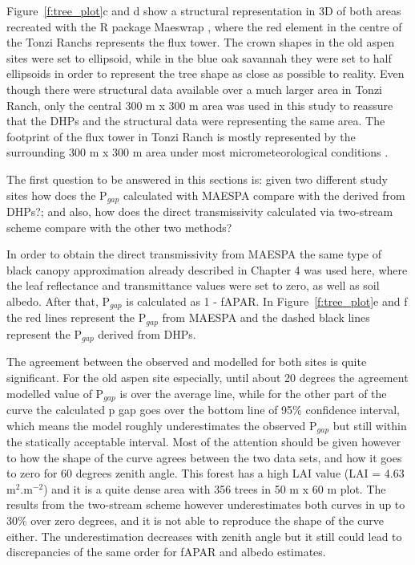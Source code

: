 \documentclass[a4paper,11pt]{report}
\begin{document}
Figure~\ref{f:tree_plot}c and d show a structural representation in 3D of both areas recreated with the R package Maeswrap \citep{Duursma2015}, where the red element in the centre of the Tonzi Ranch\textquotesingle s represents the flux tower. The crown shapes in the old aspen sites were set to ellipsoid, while in the blue oak savannah they were set to half ellipsoids in order to represent the tree shape as close as possible to reality. Even though there were structural data available over a much larger area in Tonzi Ranch, only the central 300 m x 300 m area was used in this study to reassure that the DHPs and the structural data were representing the same area. The footprint of the flux tower in Tonzi Ranch is mostly represented by the surrounding 300 m x 300 m area under most micrometeorological conditions \citep{Baldocchi2006}.

The first question to be answered in this sections is: given two different study sites how does the P$_{gap}$ calculated with MAESPA compare with the derived from DHPs?; and also, how does the direct transmissivity calculated via two-stream scheme compare with the other two methods?

In order to obtain the direct transmissivity from MAESPA the same type of black canopy approximation already described in Chapter 4 was used here, where the leaf reflectance and transmittance values were set to zero, as well as soil albedo. After that, P$_{gap}$ is calculated as 1 - fAPAR. In Figure~\ref{f:tree_plot}e and f the red lines represent the P$_{gap}$ from MAESPA and the dashed black lines represent the P$_{gap}$ derived from DHPs.

The agreement between the observed and modelled for both sites is quite significant. For the old aspen site especially, until about 20 degrees the agreement modelled value of P$_{gap}$ is over the average line, while for the other part of the curve the calculated p gap goes over the bottom line of 95\% confidence interval, which means the model roughly underestimates the observed P$_{gap}$ but still within the statically acceptable interval. Most of the attention should be given however to how the shape of the curve agrees between the two data sets, and how it goes to zero for 60 degrees zenith angle. This forest has a high LAI value (LAI = 4.63 m$^{2}$.m$^{-2}$) and it is a quite dense area with 356 trees in 50 m x 60 m plot. The results from the two-stream scheme however underestimates both curves in up to 30\% over zero degrees, and it is not able to reproduce the shape of the curve either. The underestimation decreases with zenith angle but it still could lead to discrepancies of the same order for fAPAR and albedo estimates.
\end{document}
